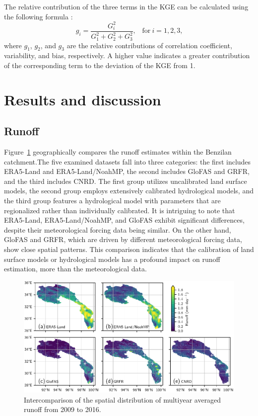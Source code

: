\documentclass[preprint, review, authoryear, longtitle, 12pt, 3p]{elsarticle}
\begin{document}
The relative contribution of the three terms in the KGE can be calculated using the following formula \citep{gupta2009JH}:
\begin{equation}
  g_i = \frac{G_i^2}{G_1^2 + G_2^2 + G_3^2} \text{,} \quad \text{for}
  \  i = 1, 2, 3 \text{,}
\end{equation}
where $g_1$, $g_2$, and $g_3$ are the relative contributions of correlation coefficient, variability, and bias, respectively. A higher value indicates a greater contribution of the corresponding term to the deviation of the KGE from 1.

\section{Results and discussion}

\subsection{Runoff}

Figure~\ref{fig:runoff_spatial} geographically compares the runoff estimates within the Benzilan catchment.The five examined datasets fall into three categories: the first includes ERA5-Land and ERA5-Land/NoahMP, the second includes GloFAS and GRFR, and the third includes CNRD. The first group utilizes uncalibrated land surface models, the second group employs extensively calibrated hydrological models, and the third group features a hydrological model with parameters that are regionalized rather than individually calibrated. It is intriguing to note that ERA5-Land, ERA5-Land/NoahMP, and GloFAS exhibit significant differences, despite their meteorological forcing data being similar. On the other hand, GloFAS and GRFR, which are driven by different meteorological forcing data, show close spatial patterns. This comparison indicates that the calibration of land surface models or hydrological models has a profound impact on runoff estimation, more than the meteorological data.

\begin{figure}[ht!]
  \centering
  \includegraphics[width=\textwidth]{runoff_mean.pdf}
  \caption{Intercomparison of the spatial distribution of multiyear averaged runoff from 2009 to 2016.}
  \label{fig:runoff_spatial}
\end{figure}
\end{document}
